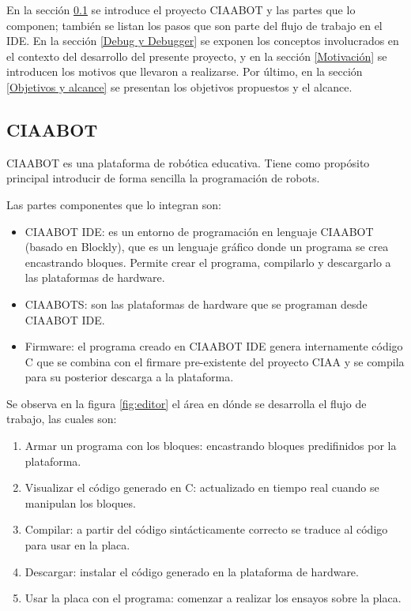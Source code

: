 En la sección \ref{CIAABOT} se introduce el proyecto CIAABOT y las partes que lo componen; también se listan los pasos que son parte del flujo de trabajo en el IDE.
En la sección \ref{Debug y Debugger} se exponen los conceptos involucrados en el contexto del desarrollo del presente proyecto, y en la sección \ref{Motivación} se introducen los motivos que llevaron a realizarse. Por último, en la sección \ref{Objetivos y alcance} se presentan los objetivos propuestos y el alcance.


\subsection{CIAABOT}
\label{CIAABOT}

CIAABOT es una plataforma de robótica educativa. Tiene como propósito principal introducir
de forma sencilla la programación de robots.

Las partes componentes que lo integran son:

\begin{itemize}
	\item CIAABOT IDE: es un entorno de programación en lenguaje CIAABOT (basado en  Blockly\citep{blockly}), que es un lenguaje gráfico donde un programa se crea encastrando bloques. Permite crear el programa, compilarlo y descargarlo a las plataformas de hardware.
	\item CIAABOTS: son las plataformas de hardware que se programan desde CIAABOT IDE. 
	\item Firmware: el programa creado en CIAABOT IDE genera internamente código C que se combina con el firmare pre-existente del proyecto CIAA y se compila para su posterior descarga a la plataforma.
\end{itemize}

Se observa en la figura \ref{fig:editor} el área en dónde se desarrolla el flujo de trabajo, las cuales son:

\begin{enumerate}
	\item Armar un programa con los bloques: encastrando bloques predifinidos por
	la plataforma.	
	\item Visualizar el código generado en C: actualizado en tiempo real cuando se
	manipulan los bloques.
	\item Compilar: a partir del código sintácticamente correcto se traduce al código
	para usar en la placa.
	\item Descargar: instalar el código generado en la plataforma de hardware.
	\item Usar la placa con el programa: comenzar a realizar los ensayos sobre la placa.
\end{enumerate}

